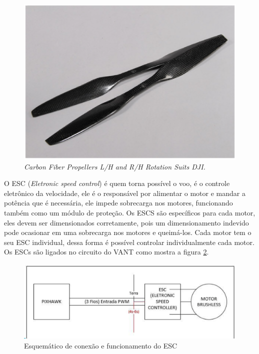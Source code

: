 \begin{figure}[H]
    \centering
      \includegraphics[keepaspectratio=true,scale=0.5]{figuras/diagramaEstru.eps}
    \caption[\textit{Carbon Fiber Propellers L/H and R/H Rotation Suits DJI.}]{\textit{Carbon Fiber Propellers L/H and R/H Rotation Suits DJI.} \cite{pinto}}
    \label{fig:elice}
\end{figure}

O ESC (\textit{Eletronic speed control}) é quem torna possível o voo, é o controle eletrônico da velocidade, ele é o responsável por 
alimentar o motor e mandar a potência que é necessária, ele impede sobrecarga nos motores, funcionando também como um módulo de proteção. 
Os ESCS são específicos para cada motor, eles devem ser dimensionados corretamente, pois um dimensionamento indevido pode ocasionar em uma 
sobrecarga nos motores e queimá-los.  Cada motor tem o seu ESC individual, dessa forma é possível controlar individualmente cada motor. Os 
ESCs são ligados no circuito do VANT como mostra a figura \ref{fig:diagramaEstru}.
 

\begin{figure}[H]
    \centering
      \includegraphics[keepaspectratio=true,scale=0.5]{figuras/elice.eps}
     \caption{Esquemático  de conexão e funcionamento  do ESC\cite{dji}}
    \label{fig:diagramaEstru}
\end{figure}

